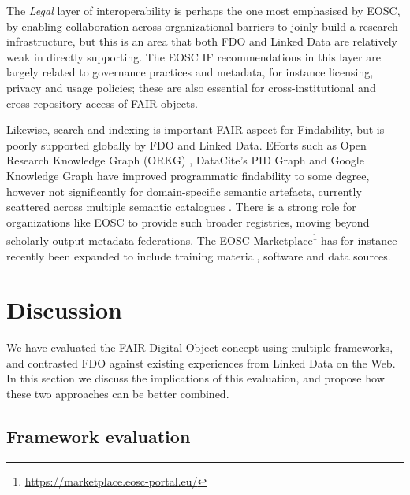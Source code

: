 \documentclass[fleqn,10pt,lineno]{wlpeerjlua}
\begin{document}
The \emph{Legal} layer of interoperability is perhaps the one most emphasised by EOSC, by enabling collaboration across organizational barriers to joinly build a research infrastructure, but this is an area that both FDO and Linked Data are relatively weak in directly supporting. The EOSC IF recommendations in this layer are largely related to governance practices and metadata, for instance licensing, privacy and usage policies; these are also essential for cross-institutional and cross-repository access of FAIR objects. 

Likewise, search and indexing is important FAIR aspect for Findability, but is poorly supported globally by FDO and Linked Data. Efforts such as Open Research Knowledge Graph (ORKG) \autocite{10.1007/978-3-030-30760-8_31}, DataCite's PID Graph \autocite{10.5438/jwvf-8a66} and Google Knowledge Graph \autocite{singhal2012} have improved programmatic findability to some degree, however not significantly for domain-specific semantic artefacts, currently scattered across multiple semantic catalogues \autocite{10.48550/arXiv.2305.06746}.  There is a strong role for organizations like EOSC to provide such broader registries, moving beyond scholarly output metadata federations. The EOSC Marketplace\footnote{\url{https://marketplace.eosc-portal.eu/}} has for instance recently been expanded to include training material, software and data sources.



\section*{Discussion}\label{sec:discussion}

We have evaluated the FAIR Digital Object concept using multiple frameworks, and contrasted FDO against existing experiences from Linked Data on the Web. In this section we discuss the implications of this evaluation, and propose how these two approaches can be better combined.

\subsection*{Framework evaluation}
\end{document}
